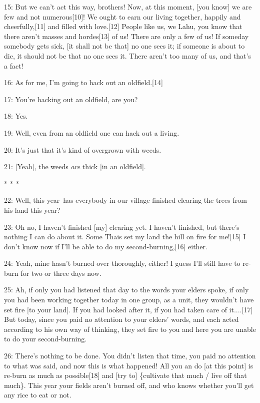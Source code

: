 15: But we can't act this way, brothers! Now, at this moment, [you know] we are
few and not numerous[10]! We ought to earn our living together, happily and cheerfully,[11]
and filled with love.[12] People like us, we Lahu, you know that there aren't masses
and hordes[13] of us! There are only a few of us! If someday somebody gets sick,
[it shall not be that] no one sees it; if someone is about to die, it should not
be that no one sees it. There aren't too many of us, and that's a fact!

16: As for me, I'm going to hack out an oldfield.[14]

17: You're hacking out an oldfield, are you?

18: Yes.

19: Well, even from an oldfield one can hack out a living.

20: It's just that it's kind of overgrown with weeds.

21: [Yeah], the weeds \textit{are} thick [in an oldfield].

\begin{center}
* * *
\end{center}

\leftskip=0pt
22: Well, this year--has everybody in our village finished clearing the trees from
his land this year?

23: Oh no, I haven't finished [my] clearing yet. I haven't finished, but there's
nothing I can do about it. Some Thais set my land the hill on fire for me![15]
I don't know now if I'll be able to do my second-burning,[16] either.

24: Yeah, mine hasn't burned over thoroughly, either! I guess I'll still have to
re-burn for two or three days now.

25: Ah, if only you had listened that day to the words your elders spoke, if only
you had been working together today in one group, as a unit, they wouldn't have
set fire [to your land]. If you had looked after it, if you had taken care of it....[17]
But today, since you paid no attention to your elders' words, and each acted according
to his own way of thinking, they set fire to you and here you are unable to do
your second-burning.

26: There's nothing to be done. You didn't listen that time, you paid no attention
to what was said, and now this is what happened! All you an do [at this point]
is re-burn as much as possible[18] and [try to] \{cultivate that much / live off
that much\}. This year your fields aren't burned off, and who knows whether you'll
get any rice to eat or not.

